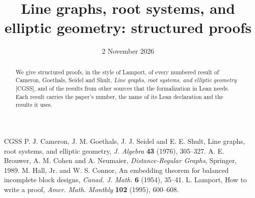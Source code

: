\documentclass[11pt]{amsart}
\begin{document}
\title{Line graphs, root systems, and elliptic geometry: structured proofs}
\date{2 November 2026}

\begin{abstract}
  We give structured proofs, in the style of Lamport, of every numbered result of Cameron,
  Goethals, Seidel and Shult, \emph{Line graphs, root systems, and elliptic geometry} [CGSS], and
  of the results from other sources that the formalization in Lean needs. Each result carries
  the paper's number, the name of its Lean declaration and the results it uses.
\end{abstract}

\maketitle
\tableofcontents
\clearpage












\begin{thebibliography}{CGSS}
 P. J. Cameron, J. M. Goethals, J. J. Seidel and E. E. Shult, Line graphs,
  root systems, and elliptic geometry, \emph{J. Algebra} \textbf{43} (1976), 305--327.
 A. E. Brouwer, A. M. Cohen and A. Neumaier, \emph{Distance-Regular Graphs},
  Springer, 1989.
 M. Hall, Jr. and W. S. Connor, An embedding theorem for balanced incomplete
  block designs, \emph{Canad. J. Math.} \textbf{6} (1954), 35--41.
 L. Lamport, How to write a proof, \emph{Amer. Math. Monthly} \textbf{102}
  (1995), 600--608.
\end{thebibliography}
\end{document}
